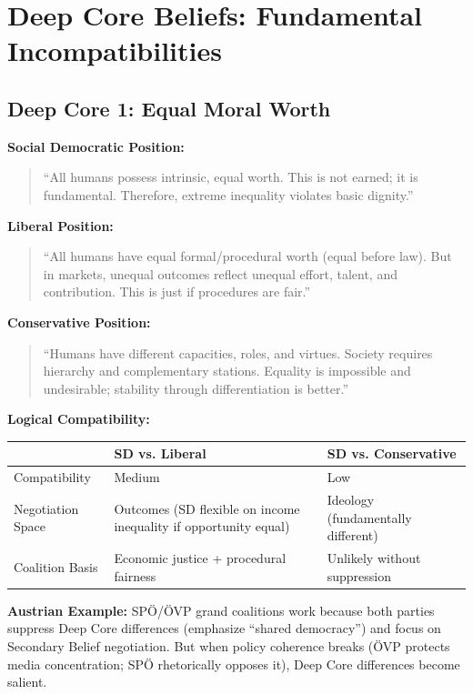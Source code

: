 
\section{Deep Core Beliefs: Fundamental Incompatibilities}
\label{sec:ck-deepcore}

\subsection{Deep Core 1: Equal Moral Worth}

\begin{tcolorbox}[colback=red!10!white, colframe=red!75!black,
    title=Belief 1: Human Equality]

\textbf{Social Democratic Position:}
\begin{quote}
``All humans possess intrinsic, equal worth. This is not earned; it is fundamental. Therefore, extreme inequality violates basic dignity.''
\end{quote}

\textbf{Liberal Position:}
\begin{quote}
``All humans have equal formal/procedural worth (equal before law). But in markets, unequal outcomes reflect unequal effort, talent, and contribution. This is just if procedures are fair.''
\end{quote}

\textbf{Conservative Position:}
\begin{quote}
``Humans have different capacities, roles, and virtues. Society requires hierarchy and complementary stations. Equality is impossible and undesirable; stability through differentiation is better.''
\end{quote}

\textbf{Logical Compatibility:}

\begin{table}[h]
\centering
\small
\renewcommand{\arraystretch}{1.2}
\begin{tabular}{@{}lll@{}}
\toprule
& \textbf{SD vs. Liberal} & \textbf{SD vs. Conservative} \\
\midrule
Compatibility & Medium & Low \\
Negotiation Space & Outcomes (SD flexible on income inequality if opportunity equal) & Ideology (fundamentally different) \\
Coalition Basis & Economic justice + procedural fairness & Unlikely without suppression \\
\bottomrule
\end{tabular}
\end{table}

\textbf{Austrian Example:} SPÖ/ÖVP grand coalitions work because both parties suppress Deep Core differences (emphasize ``shared democracy'') and focus on Secondary Belief negotiation. But when policy coherence breaks (ÖVP protects media concentration; SPÖ rhetorically opposes it), Deep Core differences become salient.

\end{tcolorbox}

